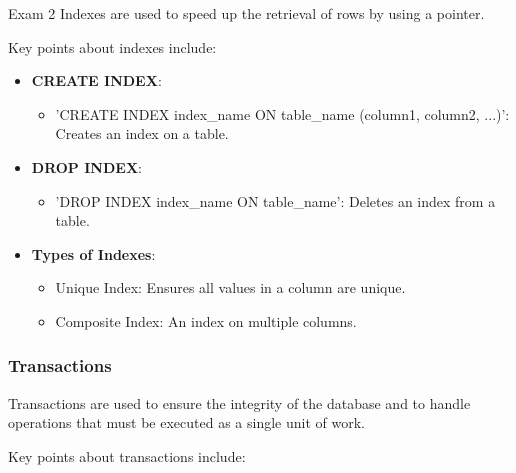 \begin{examnotes}{Exam 2}
    Indexes are used to speed up the retrieval of rows by using a pointer.
    
    \begin{highlight}[Indexes]
        Key points about indexes include:
        
        \begin{itemize}
            \item \textbf{CREATE INDEX}:
                \begin{itemize}
                    \item 'CREATE INDEX index\_name ON table\_name (column1, column2, ...)': Creates an index on a table.
                \end{itemize}
            \item \textbf{DROP INDEX}:
                \begin{itemize}
                    \item 'DROP INDEX index\_name ON table\_name': Deletes an index from a table.
                \end{itemize}
            \item \textbf{Types of Indexes}:
                \begin{itemize}
                    \item Unique Index: Ensures all values in a column are unique.
                    \item Composite Index: An index on multiple columns.
                \end{itemize}
        \end{itemize}
    \end{highlight}
    
    \subsubsection*{Transactions}
    
    Transactions are used to ensure the integrity of the database and to handle operations that must be executed as a single unit of work.
    
    \begin{highlight}[Transactions]
        Key points about transactions include:
        

\end{highlight}
\end{examnotes}
